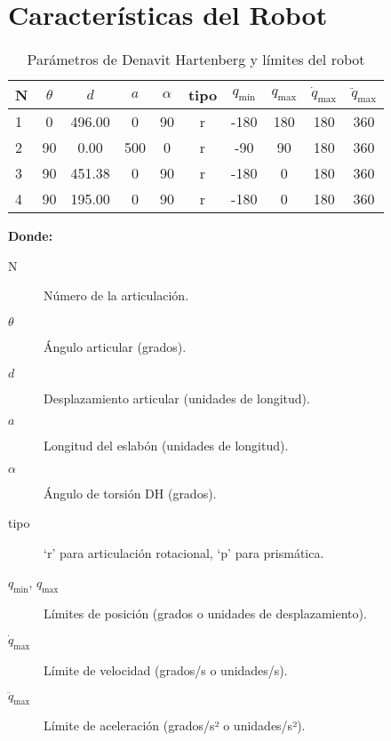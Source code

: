 \section{Características del Robot} \label{sec:caracteristicas_del_robot}

\begin{table}[ht]
	\centering
	\caption{Parámetros de Denavit Hartenberg y límites del robot}
	\label{tab:parametros_robot}
	\begin{tabular}{l|ccccccccc}
		\toprule
		N & {$\theta$} & {$d$} & {$a$} & {$\alpha$} & {tipo} 
		& {$q_{\min}$} & {$q_{\max}$} 
		& {$\dot q_{\max}$} & {$\ddot q_{\max}$} \\
		\midrule
		1 & 0   & 496.00 & 0   & 90 & r & -180 & 180 & 180 & 360 \\
		2 & 90  & 0.00   & 500 & 0  & r & -90  & 90  & 180 & 360 \\
		3 & 90  & 451.38 & 0   & 90 & r & -180 & 0   & 180 & 360 \\
		4 & 90  & 195.00 & 0   & 90 & r & -180 & 0   & 180 & 360 \\
		\bottomrule
	\end{tabular}
\end{table}

\bigskip
\noindent
\textbf{Donde:}
\begin{description}
	\item[N] Número de la articulación.
	\item[\(\theta\)] Ángulo articular (grados).
	\item[\(d\)] Desplazamiento articular (unidades de longitud).
	\item[\(a\)] Longitud del eslabón (unidades de longitud).
	\item[\(\alpha\)] Ángulo de torsión DH (grados).
	\item[tipo] ‘r’ para articulación rotacional, ‘p’ para prismática.
	\item[\(q_{\min}\), \(q_{\max}\)] Límites de posición (grados o unidades de desplazamiento).
	\item[\(\dot q_{\max}\)] Límite de velocidad (grados/s o unidades/s).
	\item[\(\ddot q_{\max}\)] Límite de aceleración (grados/s² o unidades/s²).
\end{description}


